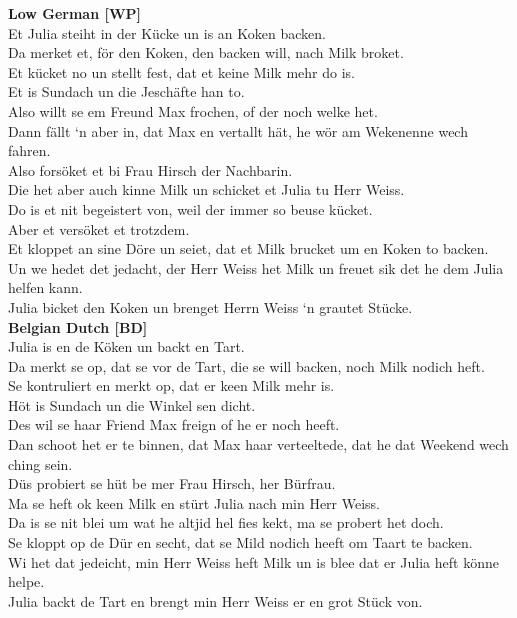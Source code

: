 \documentclass[output=paper]{LSP/langsci}
\begin{document}
{\noindent\textbf{Low German [WP]}\\ 
Et Julia steiht in der K\"ucke un is an Koken backen.\\
Da merket et, f\"or den Koken, den backen will, nach Milk broket.\\
Et k\"ucket no un stellt fest, dat et keine Milk mehr do is.\\
Et is Sundach un die Jesch\"afte han to.\\
Also willt se em Freund Max frochen, of der noch welke het.\\
Dann f\"allt ‘n aber in, dat Max en vertallt h\"at, he w\"or am Wekenenne wech fahren.\\
Also fors\"oket et bi Frau Hirsch der Nachbarin.\\
Die het aber auch kinne Milk un schicket et Julia tu Herr Weiss.\\
Do is et nit begeistert von, weil der immer so beuse k\"ucket.\\
Aber et vers\"oket et trotzdem.\\
Et kloppet an sine D\"ore un seiet, dat et Milk brucket um en Koken to backen.\\
Un we hedet det jedacht, der Herr Weiss het Milk un freuet sik det he dem Julia helfen kann.\\
Julia bicket den Koken un brenget Herrn Weiss ‘n grautet St\"ucke.\\

\noindent\textbf{Belgian Dutch [BD]}\\
Julia is en de K\"oken un backt en Tart.\\
Da merkt se op, dat se vor de Tart, die se will backen, noch Milk nodich heft.\\
Se kontruliert en merkt op, dat er keen Milk mehr is.\\
H\"ot is Sundach un die Winkel sen dicht.\\
Des wil se haar Friend Max freign of he er noch heeft.\\
Dan schoot het er te binnen, dat Max haar verteeltede, dat he dat Weekend wech ching sein.\\
D\"us probiert se h\"ut be mer Frau Hirsch, her B\"urfrau.\\
Ma se heft ok keen Milk en st\"urt Julia nach min Herr Weiss.\\
Da is se nit blei um wat he altjid hel fies kekt, ma se probert het doch.\\
Se kloppt op de D\"ur en secht, dat se Mild nodich heeft om Taart te backen. \\
Wi het dat jedeicht, min Herr Weiss heft Milk un is blee dat er Julia heft k\"onne helpe.\\
Julia backt de Tart en brengt min Herr Weiss er en grot St\"uck von.\\

}
\end{document}
